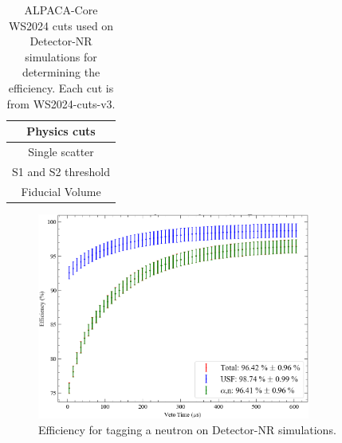 \begin{table}[!ht]
	\centering
	\caption{ALPACA-Core WS2024 cuts used on Detector-NR simulations for determining the efficiency. Each cut is from WS2024-cuts-v3.}
	\begin{tabular}{|c|}
    \hline
		\textbf{Physics cuts}        \\
		\hline
		Single scatter      \\
		S1 and S2 threshold \\
		Fiducial Volume\\
        \hline
	\end{tabular}
	\label{tab:VetoEff/detector_nr_simulation_efficiency_cuts}
\end{table}

\begin{figure}[!ht]
	\centering
	\includegraphics[width=0.8\textwidth]{figures/VetoEfficiency/det_nr_efficiency.png}
	\caption{Efficiency for tagging a neutron on Detector-NR simulations.}
	\label{fig:VetoEff/detector_nr_efficiency}
\end{figure}

\clearpage

